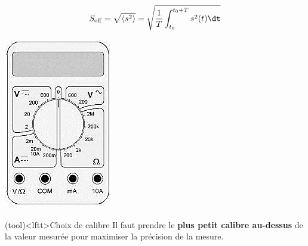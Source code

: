 \documentclass[../main/main.tex]{subfiles}
\begin{document}
{\begin{minipage}[t]{.75\linewidth}
\begin{tcb}
			\begin{equation*}
				S_{\rm eff} = \sqrt{ \left\langle s^2 \right\rangle} = \sqrt{\frac{1}{T}
					\int_{t_0}^{t_0+T} s^2(t) \dt}
			\end{equation*}
		\end{tcb}
	\end{minipage}
	\hfill
	\begin{minipage}[t]{.25\linewidth}
		\begin{center}
			\includegraphics[width=\linewidth]{multi}
		\end{center}
	\end{minipage}

	\begin{tcb}(tool)<lftt>{Choix de calibre}
		Il faut prendre le \textbf{plus petit calibre au-dessus} de la valeur
		mesurée pour maximiser la précision de la mesure.
	\end{tcb}
}
\end{document}
